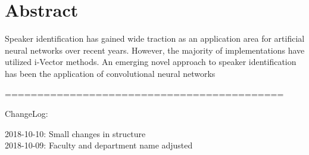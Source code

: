 \section*{Abstract}
Speaker identification has gained wide traction as an application area for artificial neural networks over recent years. However, the majority of implementations have utilized i-Vector methods. An emerging novel approach to speaker identification has been the application of convolutional neural networks 

===========================================

ChangeLog:

2018-10-10: Small changes in structure\\
2018-10-09: Faculty and department name adjusted 

